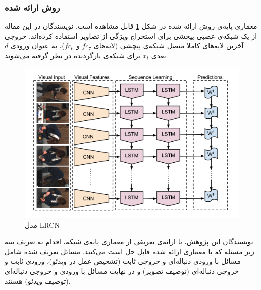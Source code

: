 \subsubsection{روش ارائه شده}
معماری پایه‌ی روش ارائه شده در شکل \ref{lrcn-1} قابل مشاهده است. نویسندگان در این مقاله از یک شبکه‌ی عصبی پیچشی برای استخراج ویژگی از تصاویر استفاده کرده‌اند. خروجی آخرین لایه‌های کاملا متصل شبکه‌ی پیچشی (لایه‌های $fc_7$ و $fc_6$)، به عنوان ورودی $d$ بعدی $x_t$ برای شبکه‌ی بازگردنده در نظر گرفته می‌شوند.
\begin{figure}[ht!]
	\centering
	\includegraphics[width=120mm]{images/lrcn-1.png}
	\caption{مدل LRCN \label{lrcn-1}\cite{Donahue2015}}
\end{figure}

نویسندگان این پژوهش، با ارائه‌ی تعریفی از معماری پایه‌ی شبکه، اقدام به تعریف سه زیر مسئله که با معماری ارائه شده قابل حل است می‌کنند.  مسائل تعریف شده شامل مسائل با ورودی دنباله‌ای و خروجی ثابت (تشخیص عمل در ویدئو)، ورودی ثابت و خروجی دنباله‌ای (توصیف تصویر) و در نهایت مسائل با ورودی و خروجی دنباله‌ای (توصیف ویدئو) هستند.

